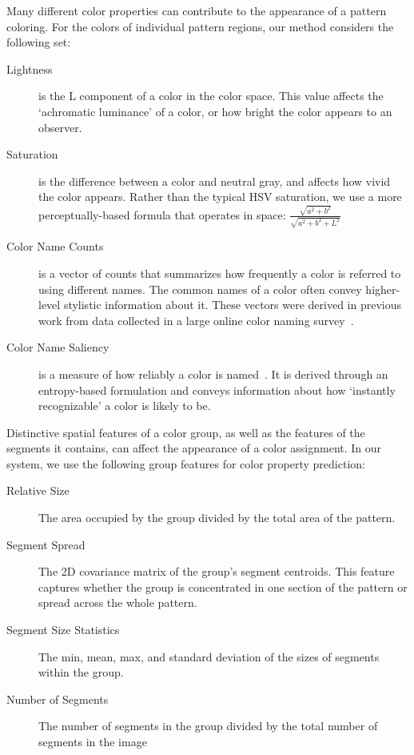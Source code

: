 Many different color properties can contribute to the appearance of a pattern coloring. For the colors of individual pattern regions, our method considers the following set:
\begin{description}
	\item[Lightness] is the L component of a color in the \lab color space. This value affects the `achromatic luminance' of a color, or how bright the color appears to an observer.
	\item[Saturation] is the difference between a color and neutral gray, and affects how vivid the color appears. Rather than the typical HSV saturation, we use a more perceptually-based formula that operates in \lab space: $\frac{\sqrt{a^2+b^2}}{\sqrt{a^2+b^2+L^2}}$ ~\cite{ColorfulnessReference}
	\item[Color Name Counts] is a vector of counts that summarizes how frequently a color is referred to using different names. The common names of a color often convey higher-level stylistic information about it. These vectors were derived in previous work from data collected in a large online color naming survey~\cite{ColorNamingModels}.
	\item[Color Name Saliency] is a measure of how reliably a color is named~\cite{ColorNamingModels}. It is derived through an entropy-based formulation and conveys information about how `instantly recognizable' a color is likely to be.
\end{description}
%
%
Distinctive spatial features of a color group, as well as the features of the segments it contains, can affect the appearance of a color assignment. In our system, we use the following group features for color property prediction:
\begin{description}
	\item[Relative Size] The area occupied by the group divided by the total area of the pattern.
  \item[Segment Spread] The 2D covariance matrix of the group's segment centroids. This feature captures whether the group is concentrated in one section of the pattern or spread across the whole pattern.
  \item[Segment Size Statistics] The min, mean, max, and standard deviation of the sizes of segments within the group.
  \item[Number of Segments] The number of segments in the group divided by the total number of segments in the image
\end{description}
